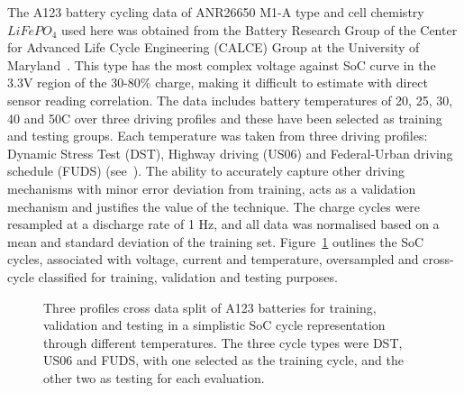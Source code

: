 %
%
{The A123 battery cycling data of ANR26650 M1-A type and cell chemistry $LiFePO_4$ used here was obtained from the Battery Research Group of the Center for Advanced Life Cycle Engineering (CALCE) Group at the University of Maryland~\cite{noauthor_calce_2017}.}
This type has the most complex voltage against SoC curve in the 3.3V region of the 30-80\% charge, making it difficult to estimate with direct sensor reading correlation.
The data includes battery temperatures of 20, 25, 30, 40 and 50\textdegree{}C over three driving profiles and these have been selected as training and testing groups.
Each temperature was taken from three driving profiles: Dynamic Stress Test (DST), Highway driving (US06) and Federal-Urban driving schedule (FUDS) (see~\cite{castillo_18_2015}).
The ability to accurately capture other driving mechanisms with minor error deviation from training, acts as a validation mechanism and justifies the value of the technique.
The charge cycles were resampled at a discharge rate of 1 Hz, and all data was normalised based on a mean and standard deviation of the training set.
Figure~\ref{fig:cross-data} outlines the SoC cycles, associated with voltage, current and temperature, oversampled and cross-cycle classified for training, validation and testing purposes.
\begin{figure}[ht]
    \centering
    
    \caption{Three profiles cross data split of A123 batteries for training, validation and testing in a simplistic SoC cycle representation through different temperatures. The three cycle types were DST, US06 and FUDS, with one selected as the training cycle, and the other two as testing for each evaluation.}
    \label{fig:cross-data}
\end{figure}

